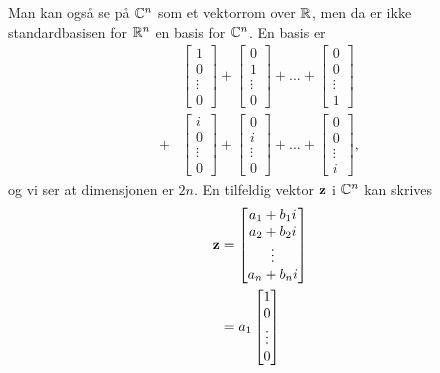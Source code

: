 \begin{ex}
Man kan også se på $\mathbb{C}^n$ som et vektorrom over $\mathbb{R}$, men da er ikke standardbasisen for $\mathbb{R}^n$ en basis for $\mathbb{C}^n$. En basis er
\begin{align*}
&
\begin{bmatrix}
1    \\ 0  \\ \vdots \\ 0
\end{bmatrix}
+
\begin{bmatrix}
0    \\ 1  \\ \vdots \\ 0
\end{bmatrix}
+...+
\begin{bmatrix}
0    \\ 0  \\ \vdots \\ 1
\end{bmatrix}
\\ +
&
\begin{bmatrix}
i    \\ 0  \\ \vdots \\ 0
\end{bmatrix}
+
\begin{bmatrix}
0    \\ i  \\ \vdots \\ 0
\end{bmatrix}
+...+
\begin{bmatrix}
0    \\ 0  \\ \vdots \\ i
\end{bmatrix},
\end{align*}
og vi ser at dimensjonen er $2n$. 
En tilfeldig vektor $\mathbf{z}$ i $\mathbb{C}^n$ kan skrives
\begin{align*}
\V z&=
\begin{bmatrix}
a_1+b_1 i    \\ a_2+b_2 i   \\ \vdots \\ a_n+b_n i 
\end{bmatrix}
\\&= 
a_1
\begin{bmatrix}
1    \\ 0  \\ \vdots \\ 0
\end{bmatrix}

\end{align*}
\end{ex}
